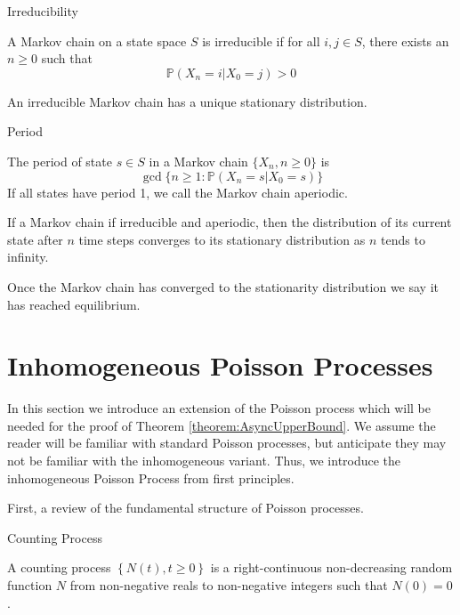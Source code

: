 \begin{definition}
	Irreducibility

	\noindent
	A Markov chain on a state space $S$ is irreducible if for all $i, j \in S$, there exists an $n \geq 0$ such that 
	$$
		\mathbb{P}(X_n = i | X_0 = j) > 0
	$$
\end{definition}

\begin{theorem}\label{theorem:uniqueStationaryDistribution}
	An irreducible Markov chain has a unique stationary distribution.
\end{theorem}

\begin{definition}
	Period

	\noindent
	The period of state $s \in S$ in a Markov chain $\{X_n, n \geq 0 \}$ is
	$$
		\gcd\{ n \geq 1 : \mathbb{P}(X_n = s | X_0 = s)\}
	$$
	If all states have period 1, we call the Markov chain aperiodic.
\end{definition}

\begin{theorem}\label{theorem:markovChainConvergence}
	If a Markov chain if irreducible and aperiodic, then the distribution of its current state after $n$ time steps converges to its stationary distribution as $n$ tends to infinity.
\end{theorem}

Once the Markov chain has converged to the stationarity distribution we say it has reached equilibrium.

\section{Inhomogeneous Poisson Processes}\label{section:inhomoPP}

In this section we introduce an extension of the Poisson process which will be needed for the proof of Theorem \ref{theorem:AsyncUpperBound}. We assume the reader will be familiar with standard Poisson processes, but anticipate they may not be familiar with the inhomogeneous variant. Thus, we introduce the inhomogeneous Poisson Process from first principles.

First, a review of the fundamental structure of Poisson processes.

\begin{definition}
	Counting Process

	\noindent
	A counting process $\left\{ N(t), t \geq 0 \right\}$ is a right-continuous non-decreasing random function $N$ from non-negative reals to non-negative integers such that $N(0) = 0$.
\end{definition}

